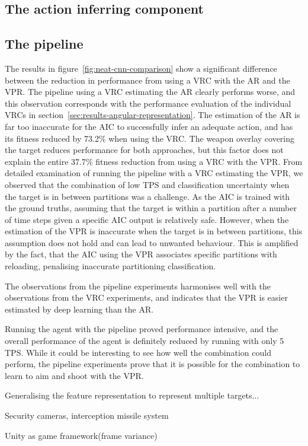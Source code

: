 \subsection{The action inferring component}



\subsection{The pipeline}
The results in figure~\ref{fig:neat-cnn-comparison} show a significant difference between the reduction in performance from using a VRC with the AR and the VPR. The pipeline using a VRC estimating the AR clearly performs worse, and this observation corresponds with the performance evaluation of the individual VRCs in section~\ref{sec:results-angular-representation}. The estimation of the AR is far too inaccurate for the AIC to successfully infer an adequate action, and has its fitness reduced by 73.2\% when using the VRC. The weapon overlay covering the target reduces performance for both approaches, but this factor does not explain the entire 37.7\% fitness reduction from using a VRC with the VPR. From detailed examination of running the pipeline with a VRC estimating the VPR, we observed that the combination of low TPS and classification uncertainty when the target is in between partitions was a challenge. As the AIC is trained with the ground truths, assuming that the target is within a partition after a number of time steps given a specific AIC output is relatively safe. However, when the estimation of the VPR is inaccurate when the target is in between partitions, this assumption does not hold and can lead to unwanted behaviour. This is amplified by the fact, that the AIC using the VPR associates specific partitions with reloading, penalising inaccurate partitioning classification.

The observations from the pipeline experiments harmonises well with the observations from the VRC experiments, and indicates that the VPR is easier estimated by deep learning than the AR.

Running the agent with the pipeline proved performance intensive, and the overall performance of the agent is definitely reduced by running with only 5 TPS. While it could be interesting to see how well the combination could perform, the pipeline experiments prove that it is possible for the combination to learn to aim and shoot with the VPR.



Generalising the feature representation to represent multiple targets...

Security cameras, interception missile system

Unity as game framework(frame variance)